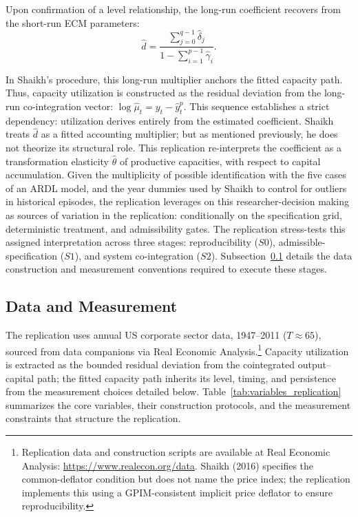 \documentclass[11pt]{article}
\begin{document}
Upon confirmation of a level relationship, the long-run coefficient recovers from the short-run ECM parameters:
\begin{equation}
\hat{d} = \frac{\sum_{j=0}^{q-1} \hat{\delta}_j}{1 - \sum_{i=1}^{p-1} \hat{\gamma}_i}.
\end{equation}

In Shaikh's procedure, this long-run multiplier anchors the fitted capacity path. Thus, capacity utilization is constructed as the residual deviation from the long-run co-integration vector: $\log \hat{\mu}_t = y_t - \hat{y}^p_t$. This sequence establishes a strict dependency: utilization derives entirely from the estimated coefficient. Shaikh treats $\hat{d}$ as a fitted accounting multiplier; but as mentioned previously, he does not theorize its structural role. This replication re-interprets the coefficient as a transformation elasticity $\hat{\theta}$ of productive capacities, with respect to capital accumulation. Given the multiplicity of possible identification with the five cases of an ARDL model, and the year dummies used by Shaikh to control for outliers in historical episodes, the replication leverages on this researcher-decision making as sources of variation in the replication: conditionally on the specification grid, deterministic treatment, and admissibility gates. The replication stress-tests this assigned interpretation across three stages: reproducibility ($S0$), admissible-specification ($S1$), and system co-integration ($S2$). Subsection~\ref{subsec:data_measurement} details the data construction and measurement conventions required to execute these stages.

\subsection{Data and Measurement}
\label{subsec:data_measurement}

The replication uses annual US corporate sector data, 1947--2011 ($T \approx 65$), sourced from \citet{Shaikh2016} data companions via Real Economic Analysis.\footnote{Replication data and construction scripts are available at Real Economic Analysis: \url{https://www.realecon.org/data}. Shaikh (2016) specifies the common-deflator condition but does not name the price index; the replication implements this using a GPIM-consistent implicit price deflator to ensure reproducibility.} Capacity utilization is extracted as the bounded residual deviation from the cointegrated output--capital path; the fitted capacity path inherits its level, timing, and persistence from the measurement choices detailed below. Table~\ref{tab:variables_replication} summarizes the core variables, their construction protocols, and the measurement constraints that structure the replication.
\end{document}
